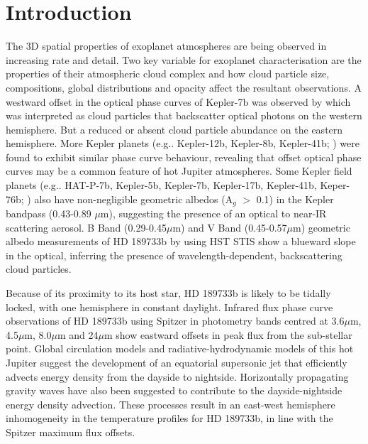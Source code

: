 \documentclass{aa}
\begin{document}

\maketitle

\section{Introduction}
\label{sec:Intro}
The 3D spatial properties of exoplanet atmospheres are being observed in increasing rate and detail.
Two key variable for exoplanet characterisation are the properties of their atmospheric cloud complex and how cloud particle size, compositions, global distributions and opacity affect the resultant observations.
A westward offset in the optical phase curves of Kepler-7b was observed by \citet{Demory2013} which was interpreted as cloud particles that backscatter optical photons on the western hemisphere.
But a reduced or absent cloud particle abundance on the eastern hemisphere.
More Kepler planets (e.g.. Kepler-12b, Kepler-8b, Kepler-41b; \citealt{Angerhausen2015,Esteves2015,Shporer2015}) were found to exhibit similar phase curve behaviour, revealing that offset optical phase curves may be a common feature of hot Jupiter atmospheres.
Some Kepler field planets (e.g.. HAT-P-7b, Kepler-5b, Kepler-7b, Kepler-17b, Kepler-41b, Keper-76b; \citealt{Heng2013,Angerhausen2015,Esteves2015}) also have non-negligible geometric albedos (A$_{g}$ $>$ 0.1) in the Kepler bandpass (0.43-0.89 $\mu$m), suggesting the presence of an optical to near-IR scattering aerosol.
B Band (0.29-0.45$\mu$m) and V Band (0.45-0.57$\mu$m) geometric albedo measurements of HD 189733b by \citet{Evans2013} using HST STIS show a blueward slope in the optical, inferring the presence of wavelength-dependent, backscattering cloud particles.

Because of its proximity to its host star, HD 189733b is likely to be tidally locked, with one hemisphere in constant daylight.
Infrared flux phase curve observations of HD 189733b using Spitzer \citep{Knutson2007,Charbonneau2008,Knutson2009,Agol2010,Knutson2012} in photometry bands centred at 3.6$\mu$m, 4.5$\mu$m, 8.0$\mu$m and 24$\mu$m show eastward offsets in peak flux from the sub-stellar point.
Global circulation models and radiative-hydrodynamic models of this hot Jupiter \citep[e.g.][]{Showman2009, Dobbs-Dixon2013, Kataria2016} suggest the development of an equatorial supersonic jet that efficiently advects energy density from the dayside to nightside.
Horizontally propagating gravity waves \citep{Watkins2010,Perez-Becker2013} have also been suggested to contribute to the dayside-nightside energy density advection.
These processes result in an east-west hemisphere inhomogeneity in the temperature profiles for HD 189733b, in line with the Spitzer maximum flux offsets.
\end{document}
